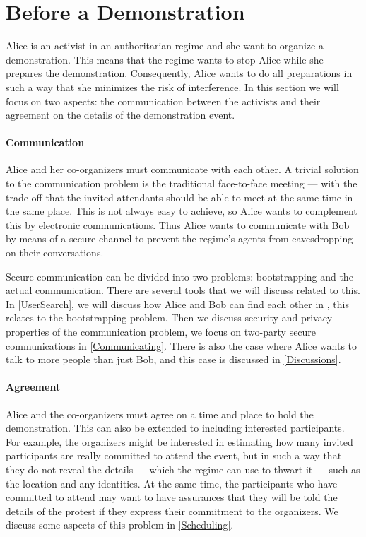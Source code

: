 \section{Before a Demonstration}
\label{BeforeProtest}

Alice is an activist in an authoritarian regime and she want to organize 
a demonstration.
This means that the regime wants to stop Alice while she prepares the 
demonstration.
Consequently, Alice wants to do all preparations in such a way that she 
minimizes the risk of interference.
In this section we will focus on two aspects: the communication between the 
activists and their agreement on the details of the demonstration event.

\paragraph{Communication}

Alice and her co-organizers must communicate with each other.
A trivial solution to the communication problem is the traditional face-to-face 
meeting --- with the trade-off that the invited attendants should be able to 
meet at the same time in the same place.
This is not always easy to achieve, so Alice wants to complement this by 
electronic communications.
Thus Alice wants to communicate with Bob by means of a secure channel to 
prevent the regime's agents from eavesdropping on their conversations.

Secure communication can be divided into two problems: bootstrapping and the 
actual communication.
There are several tools that we will discuss related to this.
In \cref{UserSearch}, we will discuss how Alice and Bob can find each other in 
, this relates to the bootstrapping problem.
Then we discuss security and privacy properties of the communication problem, 
we focus on two-party secure communications in \cref{Communicating}.
There is also the case where Alice wants to talk to more people than just Bob, 
and this case is discussed in \cref{Discussions}.

\paragraph{Agreement}

Alice and the co-organizers must agree on a time and place to hold the 
demonstration.
This can also be extended to including interested participants.
For example, the organizers might be interested in estimating how many invited 
participants are really committed to attend the event, but in such a way that 
they do not reveal the details --- which the regime can use to thwart it --- 
such as the location and any identities.
At the same time, the participants who have committed to attend may want to 
have assurances that they will be told the details of the protest if they 
express their commitment to the organizers.
We discuss some aspects of this problem in \cref{Scheduling}.

